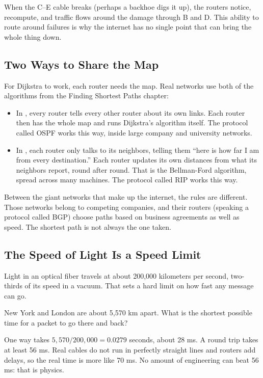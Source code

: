When the C--E cable breaks (perhaps a backhoe digs it up), the routers notice, recompute, and traffic flows
around the damage through B and D. This ability to route around failures is why the internet has no single
point that can bring the whole thing down.

\subsection{Two Ways to Share the Map}
For Dijkstra to work, each router needs the map. Real networks use both of the algorithms from the Finding
Shortest Paths chapter:
\begin{itemize}
\item In , every router tells every other router about its own links. Each
router then has the whole map and runs Dijkstra's algorithm itself. The protocol called OSPF works this
way, inside large company and university networks.
\item In , each router only talks to its neighbors, telling them ``here is
how far I am from every destination.'' Each router updates its own distances from what its neighbors
report, round after round. That is the Bellman-Ford algorithm, spread across many machines. The protocol
called RIP works this way.
\end{itemize}

Between the giant networks that make up the internet, the rules are different. Those networks belong to
competing companies, and their routers (speaking a protocol called BGP) choose paths based on business
agreements as well as speed. The shortest path is not always the one taken.

\subsection{The Speed of Light Is a Speed Limit}
Light in an optical fiber travels at about 200,000 kilometers per second, two-thirds of its speed in a
vacuum. That sets a hard limit on how fast any message can go.

\begin{Worked}
\begin{Problem}
New York and London are about 5,570 km apart. What is the shortest possible time for a
packet to go there and back?
\end{Problem}
\begin{Solution}
One way takes $5{,}570 / 200{,}000 = 0.0279$ seconds, about 28 ms. A round trip takes at
least 56 ms. Real cables do not run in perfectly straight lines and routers add delays, so the real time is
more like 70 ms. No amount of engineering can beat 56 ms: that is physics.
\end{Solution}
\end{Worked}

